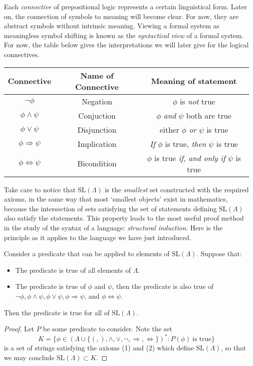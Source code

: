 Each \emph{connective} of prepositional logic represents a certain linguistical form. Later on, the connection of symbols to meaning will become clear. For now, they are abstract symbols without intrinsic meaning. Viewing a formal system as meaningless symbol shifting is known as the {\it syntactical view} of a formal system. For now, the table below gives the interpretations we will later give for the logical connectives.
%
\begin{center}
\begin{tabular}{| c | c | c |}
    \hline Connective & Name of Connective & Meaning of statement \\
    \hline $\neg \phi$ & Negation & $\phi$ is {\it not} true\\
    $\phi \wedge \psi$ & Conjuction & $\phi$ {\it and} $\psi$ both are true\\
    $\phi \vee \psi$ & Disjunction & either $\phi$ {\it or} $\psi$ is true\\
    $\phi \Rightarrow \psi$ & Implication & {\it If} $\phi$ is true, {\it then} $\psi$ is true\\
    $\phi \Leftrightarrow \psi$ & Bicondition & $\phi$ is true {\it if, and only if} $\psi$ is true\\
    \hline
\end{tabular}
\end{center}

Take care to notice that $\text{SL}(\Lambda)$ is the {\it smallest} set constructed with the required axioms, in the same way that most `smallest objects' exist in mathematics, because the intersection of sets satisfying the set of statements defining $\text{SL}(\Lambda)$ also satisfy the statements. This property leads to the most useful proof method in the study of the syntax of a language: \emph{structural induction}. Here is the principle as it applies to the language we have just introduced.

\begin{theorem}
    Consider a predicate that can be applied to elements of $\text{SL}(\Lambda)$. Suppose that:
    \begin{itemize}
        \item The predicate is true of all elements of $\Lambda$.
        \item The predicate is true of $\phi$ and $\psi$, then the predicate is also true of $\neg \phi, \phi \wedge \psi, \phi \vee \psi, \phi \Rightarrow \psi$, and $\phi \Leftrightarrow \psi$.
    \end{itemize}
    Then the predicate is true for all of $\text{SL}(\Lambda)$.
\end{theorem}
\begin{proof}
    Let $P$ be some predicate to consider. Note the set
    \[ K = \{ \phi \in (\Lambda \cup \{ (, ), \wedge, \vee, \neg, \Rightarrow, \Leftrightarrow \})^* : P(\phi)\ \text{is true} \} \]
    is a set of strings satisfying the axioms (1) and (2) which define $\text{SL}(\Lambda)$, so that we may conclude $\text{SL}(\Lambda) \subset K$.
\end{proof}

